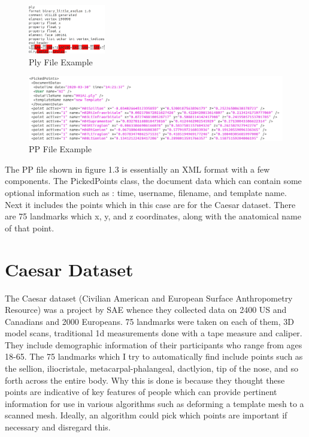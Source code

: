\begin{figure}[!htb]
	\caption{Ply File Example}
	\centering
	\includegraphics[width=0.3\textwidth]{images/ply_file.png}
\end{figure}
\begin{figure}[!htb]
	\caption{PP File Example}
	\centering
	\includegraphics[width=1.1\textwidth]{images/pp_file.png}
\end{figure}

The PP file shown in figure 1.3 is essentially an XML format with a few components. The PickedPoints class, the document data which can contain some optional information such as : time, username, filename, and template name. Next it includes the points which in this case are for the Caesar dataset. There are 75 landmarks which x, y, and z coordinates, along with the anatomical name of that point.

\section{Caesar Dataset}
The Caesar dataset (Civilian American and European Surface Anthropometry Resource) was a project by SAE whence they collected data on 2400 US and Canadians and 2000 Europeans. 75 landmarks were taken on each of them, 3D model scans, traditional 1d measurements done with a tape measure and caliper. They include demographic information of their participants who range from ages 18-65. The 75 landmarks which I try to automatically find include points such as the sellion, iliocristale, metacarpal-phalangeal, dactlyion, tip of the nose, and so forth across the entire body. Why this is done is because they thought these points are indicative of key features of people which can provide pertinent information for use in various algorithms such as deforming a template mesh to a scanned mesh. Ideally, an algorithm could pick which points are important if necessary and disregard this.

